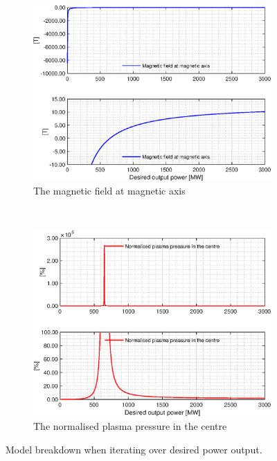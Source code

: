 \begin{figure}[H]
	\centering
  \begin{subfigure}[b]{.46\textwidth}
    \includegraphics[width=\textwidth]{MatlabFigures/PE/f7.eps}
    \caption{The magnetic field at magnetic axis\vspace{\baselineskip}}
    \label{PEM}
  \end{subfigure}
  ~
  \begin{subfigure}[b]{.45\textwidth}
    \includegraphics[width=\textwidth]{MatlabFigures/PE/f8.eps}
    \caption{The normalised plasma pressure in the centre}
    \label{PEB}
  \end{subfigure}
	\caption{Model breakdown when iterating over desired power output.}
	\label{PE}
\end{figure}
